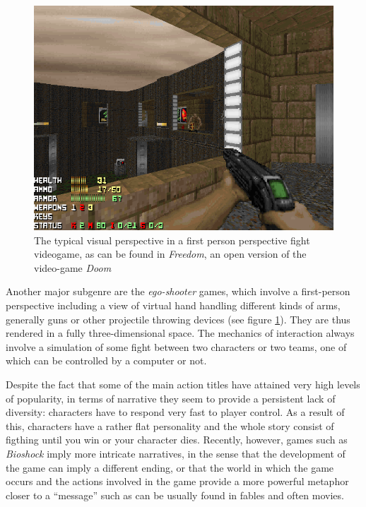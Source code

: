 \documentclass[
		twoside,openright,titlepage,numbers=noenddot,manychapters,
		headinclude,%
                footinclude=false,cleardoublepage=empty,
                BCOR=5mm,
		fontsize=11pt, %
                 enabledeprecatedfontcommands]{scrreprt}
\begin{document}
\begin{figure}[]

\begin{center}
\includegraphics[width=12cm]{figures/videogames/Freedoom_aaa.png}
\caption{ The typical visual perspective in a first person perspective fight videogame, as can be found in \emph{Freedom}, an open version of the video-game \emph{Doom} }
\label{doom} 
\end{center}

\end{figure}

Another major subgenre are the \emph{ego-shooter} games, which involve a first-person perspective including a view of virtual hand handling different kinds of arms, generally guns or other projectile throwing devices (see figure \ref{doom}). They are thus rendered in a fully three-dimensional space. The mechanics of interaction always involve a simulation of some fight between two characters or two teams, one of which can be controlled by a computer or not. 

Despite the fact that some of the main action titles have attained very high levels of popularity, in terms of narrative they seem to provide a persistent lack of diversity: characters have to respond very fast to player control. As a result of this, characters have a rather flat personality and the whole story consist of figthing until you win or your character dies. Recently, however, games such as \emph{Bioshock} imply more intricate narratives, in the sense that the development of the game can imply a different ending, or that the world in which the game occurs and the actions involved in the game provide a more powerful metaphor closer to a ``message'' such as can be usually found in fables and often movies. 
\end{document}
